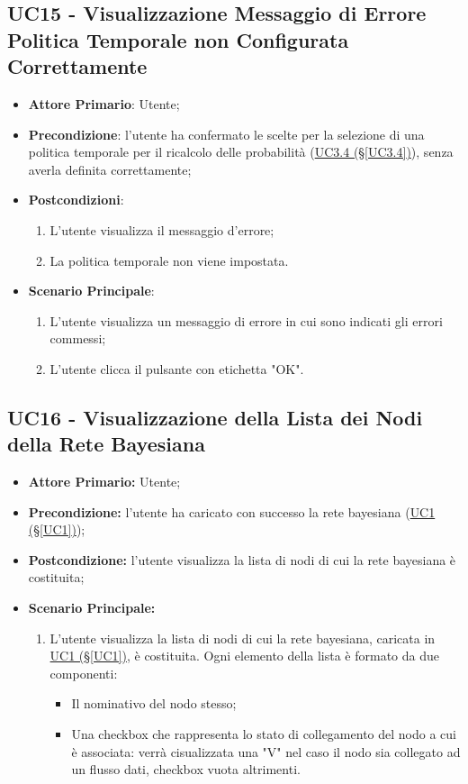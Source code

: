\pagebreak

\subsection{UC15 - Visualizzazione Messaggio di Errore Politica Temporale non Configurata Correttamente}\label{UC15}
\begin{itemize}
	\item \textbf{Attore Primario}: Utente;
	\item \textbf{Precondizione}: l'utente ha confermato le scelte per la selezione di una politica temporale per il ricalcolo delle probabilità (\hyperref[UC3.4]{UC3.4 (§\ref*{UC3.4})}), senza averla definita correttamente;
	\item \textbf{Postcondizioni}:
	\begin{enumerate}
		\item L'utente visualizza il messaggio d'errore;
		\item La politica temporale non viene impostata.
	\end{enumerate}
	\item \textbf{Scenario Principale}:
	\begin{enumerate}
		\item L'utente visualizza un messaggio di errore in cui sono indicati gli errori commessi;
		\item L'utente clicca il pulsante con etichetta "OK".
	\end{enumerate}
\end{itemize}

\pagebreak

\subsection{UC16 - Visualizzazione della Lista dei Nodi della Rete Bayesiana}\label{UC16}
\begin{itemize}
	\item \textbf{Attore Primario:}  Utente;
	\item \textbf{Precondizione:} l'utente ha caricato con successo la rete bayesiana (\hyperref[UC1]{UC1 	(§\ref*{UC1})});
	\item \textbf{Postcondizione:} l'utente visualizza la lista di nodi di cui la rete bayesiana è costituita;
	\item \textbf{Scenario Principale:}
	\begin{enumerate}
		\item L'utente visualizza la lista di nodi di cui la rete bayesiana, caricata in \hyperref[UC1]{UC1 									(§\ref*{UC1})}, è costituita. Ogni elemento della lista è formato da due componenti:
		\begin{itemize}
			\item Il nominativo del nodo stesso;
			\item Una checkbox che rappresenta lo stato di collegamento del nodo a cui è associata: verrà cisualizzata una "V" nel caso il nodo sia collegato ad un flusso dati, checkbox vuota altrimenti.
		\end{itemize}
	\end{enumerate}
\end{itemize}


